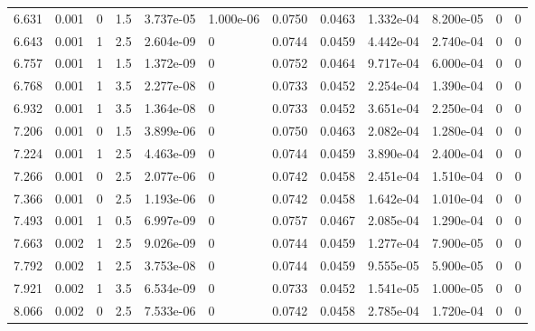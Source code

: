 \documentclass[preview]{standalone}
\begin{document}
{{{\begin{tabular}{L{1.2cm}C{1.2cm} C{0.3cm}C{0.5cm} C{1.4cm}C{1.4cm} C{1.4cm}C{1.4cm} C{1.6cm}C{1.6cm} C{1.6cm}C{1.6cm}}
  6.631  &  0.001  & 0     & 1.5 &  3.737e-05  & 1.000e-06  &  0.0750&   0.0463& 1.332e-04 & 8.200e-05   &  0 & 0  \\ 
  6.643  &  0.001  & 1     & 2.5 &  2.604e-09  & 0  &  0.0744&   0.0459& 4.442e-04 & 2.740e-04   &  0 & 0  \\ 
  6.757  &  0.001  & 1     & 1.5 &  1.372e-09  & 0  &  0.0752&   0.0464& 9.717e-04 & 6.000e-04   &  0 & 0  \\ 
  6.768  &  0.001  & 1     & 3.5 &  2.277e-08  & 0  &  0.0733&   0.0452& 2.254e-04 & 1.390e-04   &  0 & 0  \\ 
  6.932  &  0.001  & 1     & 3.5 &  1.364e-08  & 0  &  0.0733&   0.0452& 3.651e-04 & 2.250e-04   &  0 & 0  \\ 
  7.206  &  0.001  & 0     & 1.5 &  3.899e-06  & 0  &  0.0750&   0.0463& 2.082e-04 & 1.280e-04   &  0 & 0  \\ 
  7.224  &  0.001  & 1     & 2.5 &  4.463e-09  & 0  &  0.0744&   0.0459& 3.890e-04 & 2.400e-04   &  0 & 0  \\ 
  7.266  &  0.001  & 0     & 2.5 &  2.077e-06  & 0  &  0.0742&   0.0458& 2.451e-04 & 1.510e-04   &  0 & 0  \\ 
  7.366  &  0.001  & 0     & 2.5 &  1.193e-06  & 0  &  0.0742&   0.0458& 1.642e-04 & 1.010e-04   &  0 & 0  \\ 
  7.493  &  0.001  & 1     & 0.5 &  6.997e-09  & 0  &  0.0757&   0.0467& 2.085e-04 & 1.290e-04   &  0 & 0  \\ 
  7.663  &  0.002  & 1     & 2.5 &  9.026e-09  & 0  &  0.0744&   0.0459& 1.277e-04 & 7.900e-05   &  0 & 0  \\ 
  7.792  &  0.002  & 1     & 2.5 &  3.753e-08  & 0  &  0.0744&   0.0459& 9.555e-05 & 5.900e-05   &  0 & 0  \\ 
  7.921  &  0.002  & 1     & 3.5 &  6.534e-09  & 0  &  0.0733&   0.0452& 1.541e-05 & 1.000e-05   &  0 & 0  \\ 
  8.066  &  0.002  & 0     & 2.5 &  7.533e-06  & 0  &  0.0742&   0.0458& 2.785e-04 & 1.720e-04   &  0 & 0  \\ 
\hline 
\end{tabular} 

}}}
\end{document}
